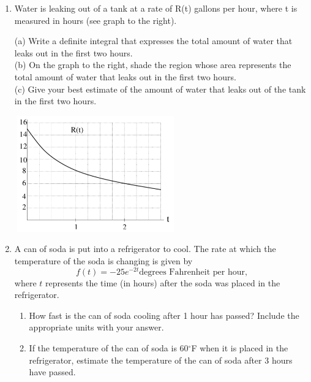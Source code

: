 \documentclass[12pt]{article}
\begin{document}
\begin{enumerate}
\newpage
~
\item Water is leaking out of a tank at a rate of R(t) gallons per hour, where t is measured in hours (see graph to the right).\\

\noindent\begin{minipage}{0.5\textwidth}%

(a) Write a definite integral that expresses the total amount of water that leaks out in the first two hours.\\

(b) On the graph to the right, shade the region whose area represents the total amount of water that leaks out in the first two hours.\\

(c) Give your best estimate of the amount of water that leaks out of the tank in the first two hours.\\

\end{minipage}%
\hspace{4mm}
\begin{minipage}{0.5\textwidth}
\includegraphics [height=50mm, width=70mm]{5_3_2}
\end{minipage}
\vfill


	\vfill
\item A can of soda is put into a refrigerator to cool. The rate at which the temperature of the soda is changing is
given by $$f(t)= -25e^{-2t} \text{degrees Fahrenheit per hour,}$$
 where $t$ represents the time (in hours) after the soda was placed in the refrigerator.
 	\begin{enumerate}
	\item How fast is the can of soda cooling after 1 hour has passed? Include the appropriate units with your answer.
	\vfill
	\item If the temperature of the can of soda is 60$^\circ$F when it is placed in the refrigerator, estimate the temperature of the can of soda after 3 hours have passed.
	\end{enumerate}
\vfill

\end{enumerate}
\end{document}
